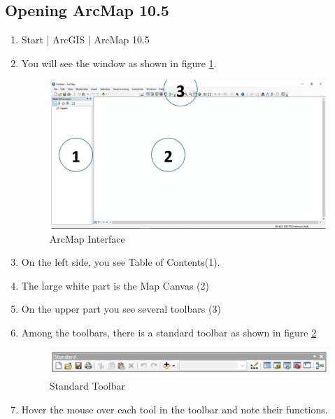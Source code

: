 \subsection{Opening ArcMap 10.5}
\begin{enumerate}
\item{Start |  ArcGIS  | ArcMap 10.5}
\item{You will see the window as shown in figure \ref{fig:ArcMap_Interface}.}
	\begin{figure}[h]
	\label{fig:ArcMap_Interface}
	\centering
	\includegraphics[scale=0.5]{images/interface}
	\caption{ArcMap Interface}
	\end{figure}
\item{On the left side, you see Table of Contents(1).}
\item{The large white part is the Map Canvas (2)}
\item{On the upper part you see several toolbars (3)}
\item{Among the toolbars, there is a standard toolbar as shown in figure \ref{fig:Standard_Toolbar}}
	\begin{figure}[h]
	\label{fig:Standard_Toolbar}
	\centering
	\includegraphics[scale=0.5]{images/standard_toolbar}
	\caption{Standard Toolbar}
	\end{figure}
\item{Hover the mouse over each tool in the toolbar and note their functions.}
\end{enumerate}

